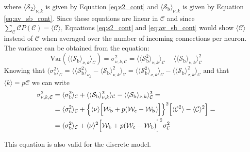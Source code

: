 \documentclass[a4paper, 12pt, twoside, openright]{book}
\newcommand{\C}{\mathcal{C}}
\newcommand{\Wb}{\mathcal{W}_\text{b}}
\newcommand{\Wc}{\mathcal{W}_\text{c}}
\newcommand{\SII}{\mathcal{S}_\text{2}}
\newcommand{\Sb}{\mathcal{S}_\text{b}}
\newcommand{\varSb}{\sigma^{2}_\text{b}}
\begin{document}
where $\langle \SII \rangle_{\nu,k}$ is given by Equation \eqref{eq:s2_cont} and $\langle \Sb \rangle _{\nu,k}$ is given by Equation \eqref{eq:av_sb_cont}. Since these equations are linear in $\C$ and since $\sum_{\C} \C P(\C) = \langle\C\rangle$, Equations \eqref{eq:s2_cont} and \eqref{eq:av_sb_cont} would show $\langle\C\rangle$ instead of $\C$ when averaged over the number of incoming connections per neuron.\\
The variance can be obtained from the equation: 
\begin{equation}
    \text{Var}(\langle \langle \Sb \rangle_{\nu,k}\rangle_{\C})= \sigma^2_{\nu,k,\C} =\langle\langle\Sb^2\rangle_{\nu,k}\rangle_{\C}-\langle\langle\Sb\rangle_{\nu,k}\rangle_{\C}^2
\end{equation}
Knowing that $\langle \varSb\rangle_{\C}=\langle \langle
\Sb^2\rangle_{\nu_k}-\langle\Sb\rangle_{\nu,k}^2\rangle_{\C}
=\langle\langle\Sb^2\rangle_{\nu,k}\rangle_{\C}-\langle\langle\Sb\rangle_{\nu,k}^2\rangle_{\C}$ and that $\langle k \rangle = p\C$ we can write
\begin{equation}
\begin{split}
    \sigma^2_{\nu,k,\C} &= \langle\varSb\rangle_{\C} + \langle\langle\Sb\rangle_{\nu,k}^2\rangle_{\C}-\langle\langle\Sb\rangle_{\nu,k}\rangle_{\C}^2=\\
    &= \langle\varSb\rangle_{\C} + \Bigl\{ \langle\nu\rangle \Bigl[ \Wb + p(\Wc-\Wb) \Bigr] \Bigr\}^2 \Bigl[ \langle\C^2\rangle - \langle\C\rangle^2 \Bigr] =\\
    &= \langle\varSb\rangle_{\C} + \langle\nu\rangle^2 \Bigl[ \Wb + p(\Wc-\Wb) \Bigr]^2 \sigma_{\C}^2
\end{split}
\label{eq:var_sb_c_variable}
\end{equation}

This equation is also valid for the discrete model.
\end{document}
